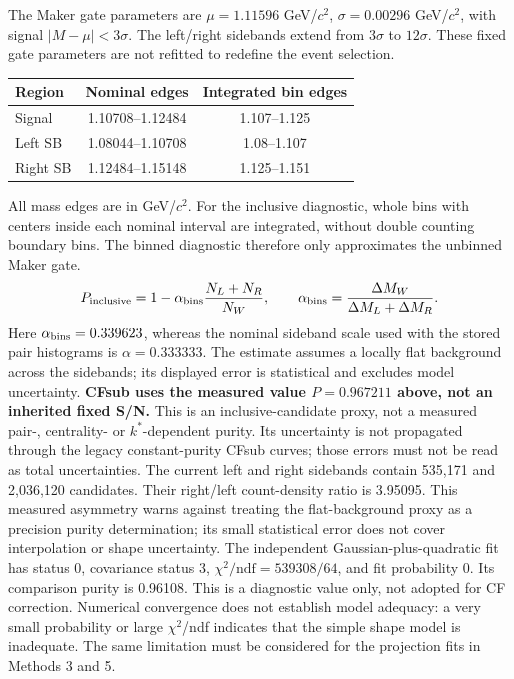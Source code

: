 \documentclass[11pt,a4paper]{article}
\begin{document}
The Maker gate parameters are $\mu=1.11596$ GeV/$c^2$, $\sigma=0.00296$ GeV/$c^2$, with signal $|M-\mu|<3\sigma$. The left/right sidebands extend from $3\sigma$ to $12\sigma$. These fixed gate parameters are not refitted to redefine the event selection.
\begin{center}\begin{tabular}{lcc}\hline Region & Nominal edges & Integrated bin edges\\\hline
Signal & 1.10708--1.12484 & 1.107--1.125\\
Left SB & 1.08044--1.10708 & 1.08--1.107\\
Right SB & 1.12484--1.15148 & 1.125--1.151\\
\hline\end{tabular}\end{center}
All mass edges are in GeV/$c^2$. For the inclusive diagnostic, whole bins with centers inside each nominal interval are integrated, without double counting boundary bins. The binned diagnostic therefore only approximates the unbinned Maker gate.
\begin{equation}P_{\rm inclusive}=1-\alpha_{\rm bins}\frac{N_L+N_R}{N_W},\qquad \alpha_{\rm bins}=\frac{\Delta M_W}{\Delta M_L+\Delta M_R}.\end{equation}
Here $\alpha_{\rm bins}=0.339623$, whereas the nominal sideband scale used with the stored pair histograms is $\alpha=0.333333$. The estimate assumes a locally flat background across the sidebands; its displayed error is statistical and excludes model uncertainty.
\textbf{CFsub uses the measured value $P=0.967211$ above, not an inherited fixed S/N.} This is an inclusive-candidate proxy, not a measured pair-, centrality- or $k^*$-dependent purity. Its uncertainty is not propagated through the legacy constant-purity CFsub curves; those errors must not be read as total uncertainties.
The current left and right sidebands contain 535,171 and 2,036,120 candidates. Their right/left count-density ratio is 3.95095. This measured asymmetry warns against treating the flat-background proxy as a precision purity determination; its small statistical error does not cover interpolation or shape uncertainty.
The independent Gaussian-plus-quadratic fit has status 0, covariance status 3, $\chi^2/\mathrm{ndf}=539308/64$, and fit probability 0. Its comparison purity is 0.96108. This is a diagnostic value only, not adopted for CF correction. Numerical convergence does not establish model adequacy: a very small probability or large $\chi^2$/ndf indicates that the simple shape model is inadequate. The same limitation must be considered for the projection fits in Methods 3 and 5.
\end{document}

